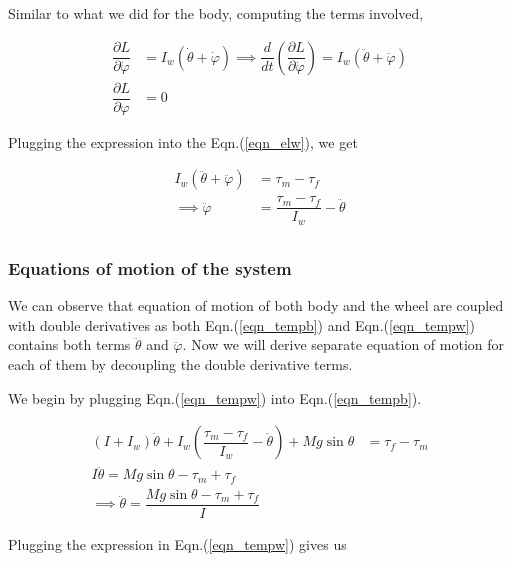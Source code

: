 \documentclass{article}
\begin{document}
Similar to what we did for the body, computing the terms involved,

\begin{equation}
  \begin{split}
  \dfrac{\partial L}{\partial \dot{\varphi}}&=I_w (\dot{\theta} + \dot{\varphi})\implies\dfrac{d}{dt}\left(\dfrac{\partial L}{\partial\dot{\varphi}} \right)=I_{w}(\ddot{\theta}+\ddot{\varphi})\\
  \dfrac{\partial L}{\partial\varphi}&=0
  \end{split}
\end{equation}

Plugging the expression into the Eqn.(\ref{eqn_elw}), we get

\begin{equation}
  \label{eqn_tempw}
  \begin{split}
    I_{w}(\ddot{\theta}+\ddot{\varphi})&=\tau_{m}-\tau_{f}\\
    \implies\ddot{\varphi}&= \dfrac{\tau_m - \tau_f}{I_w} - \ddot{\theta}\\
  \end{split}
\end{equation}

\subsubsection*{Equations of motion of the system}

We can observe that equation of motion of both body and the wheel are coupled with double derivatives as both Eqn.(\ref{eqn_tempb}) and  Eqn.(\ref{eqn_tempw}) contains both terms $\ddot{\theta}$ and $\ddot{\varphi}$. Now we will derive separate equation of motion for each of them by decoupling the double derivative terms.

We begin by plugging Eqn.(\ref{eqn_tempw}) into Eqn.(\ref{eqn_tempb}).

\begin{equation}
  \begin{split}
    \label{eqn_eomb}
    (I+I_{w})\ddot{\theta}+I_{w}\left(\dfrac{\tau_{m}-\tau_{f}}{I_{w}}-\ddot{\theta}\right)+Mg\sin\theta&=\tau_{f}-\tau_{m}\\
  I\ddot{\theta}=Mg\sin\theta-\tau_{m}+\tau_{f}\\
  \implies\ddot{\theta}=\dfrac{Mg\sin\theta-\tau_{m}+\tau_{f}}{I}
  \end{split}
\end{equation}

Plugging the expression in Eqn.(\ref{eqn_tempw}) gives us
\end{document}

